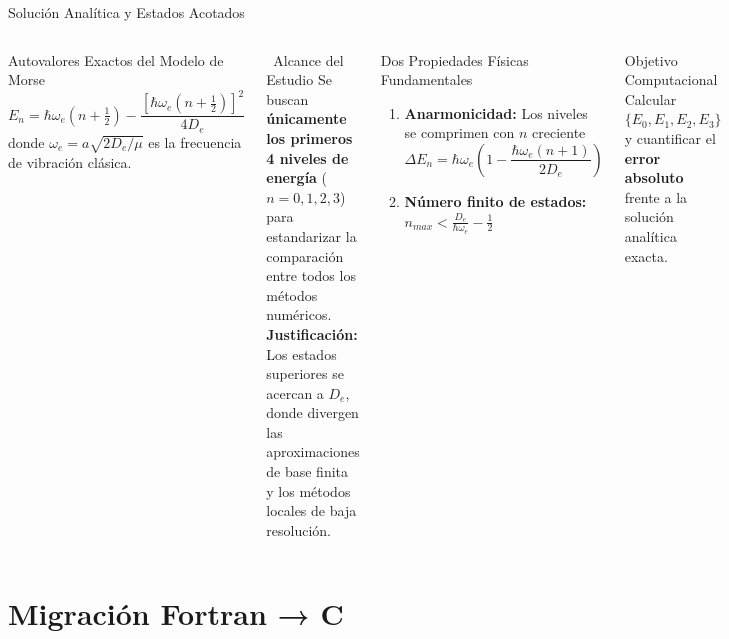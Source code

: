 \documentclass[aspectratio=169,10pt]{beamer}
\begin{document}
\begin{frame}[allowframebreaks]{Solución Analítica y Estados Acotados}
\begin{columns}[T]
\begin{physbox}{Autovalores Exactos del Modelo de Morse}
\[
  E_n = \hbar\omega_e\!\left(n+\tfrac{1}{2}\right)
        - \frac{\left[\hbar\omega_e\!\left(n+\tfrac{1}{2}\right)\right]^2}{4D_e}
\]
donde $\omega_e = a\sqrt{2D_e/\mu}$ es la frecuencia de vibración clásica.
\end{physbox}
\vspace{-0.18cm}
\begin{alertbox}{\faExclamationTriangle\ Alcance del Estudio}
Se buscan \textbf{únicamente los primeros 4 niveles de energía} ($n=0,1,2,3$) para estandarizar la comparación entre todos los métodos numéricos.\\[2pt]
\textbf{Justificación:} Los estados superiores se acercan a $D_e$, donde divergen las aproximaciones de base finita y los métodos locales de baja resolución.
\end{alertbox}

\begin{block}{Dos Propiedades Físicas Fundamentales}
\begin{enumerate}\setlength\itemsep{4pt}
  \item \textbf{Anarmonicidad:} Los niveles se comprimen con $n$ creciente
  \[
    \Delta E_{n} = \hbar\omega_e\left(1 - \frac{\hbar\omega_e(n+1)}{2D_e}\right)
  \]
  \item \textbf{Número finito de estados:} $n_{max} < \frac{D_e}{\hbar\omega_e} - \frac{1}{2}$
\end{enumerate}
\end{block}
\vspace{-0.155cm}
\begin{successbox}{Objetivo Computacional}
Calcular $\{E_0, E_1, E_2, E_3\}$ y cuantificar el \textbf{error absoluto} frente a la solución analítica exacta.
\end{successbox}
\end{columns}
\end{frame}

\section{Migración Fortran → C}
\end{document}
